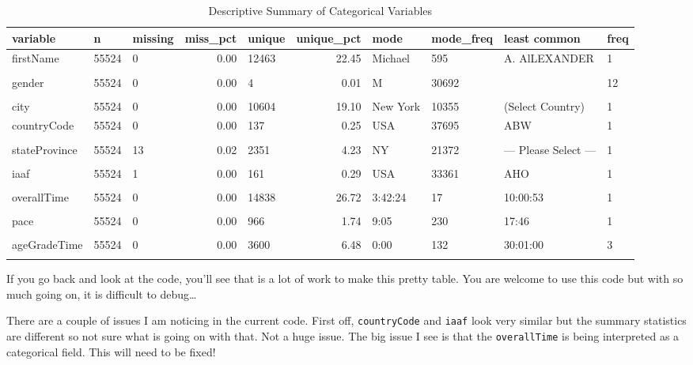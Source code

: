 \documentclass[
]{article}
\begin{document}
\begin{table}[H]
\centering
\caption{\label{tab:unnamed-chunk-9}Descriptive Summary of Categorical Variables}
\centering
\fontsize{7}{9}\selectfont
\begin{tabular}[t]{lllrlrllll}
\toprule
\textbf{variable} & \textbf{n} & \textbf{missing} & \textbf{miss\_pct} & \textbf{unique} & \textbf{unique\_pct} & \textbf{mode} & \textbf{mode\_freq} & \textbf{least common} & \textbf{freq}\\
\midrule
firstName & 55524 & 0 & 0.00 & 12463 & 22.45 & Michael & 595 & A. AlLEXANDER & 1\\
\addlinespace[0.25em]\\
gender & 55524 & 0 & 0.00 & 4 & 0.01 & M & 30692 &  & 12\\
\addlinespace[0.25em]\\
city & 55524 & 0 & 0.00 & 10604 & 19.10 & New York & 10355 & (Select Country) & 1\\
\addlinespace[0.25em]
countryCode & 55524 & 0 & 0.00 & 137 & 0.25 & USA & 37695 & ABW & 1\\
\addlinespace[0.25em]\\
stateProvince & 55524 & 13 & 0.02 & 2351 & 4.23 & NY & 21372 & --- Please Select --- & 1\\
\addlinespace[0.25em]\\
\addlinespace
iaaf & 55524 & 1 & 0.00 & 161 & 0.29 & USA & 33361 & AHO & 1\\
\addlinespace[0.25em]\\
overallTime & 55524 & 0 & 0.00 & 14838 & 26.72 & 3:42:24 & 17 & 10:00:53 & 1\\
\addlinespace[0.25em]\\
pace & 55524 & 0 & 0.00 & 966 & 1.74 & 9:05 & 230 & 17:46 & 1\\
\addlinespace[0.25em]\\
ageGradeTime & 55524 & 0 & 0.00 & 3600 & 6.48 & 0:00 & 132 & 30:01:00 & 3\\
\addlinespace[0.25em]\\
\bottomrule
\end{tabular}
\end{table}

If you go back and look at the code, you'll see that is a lot of work to
make this pretty table. You are welcome to use this code but with so
much going on, it is difficult to debug\ldots{}

There are a couple of issues I am noticing in the current code. First
off, \texttt{countryCode} and \texttt{iaaf} look very similar but the
summary statistics are different so not sure what is going on with that.
Not a huge issue. The big issue I see is that the \texttt{overallTime}
is being interpreted as a categorical field. This will need to be fixed!
\end{document}
